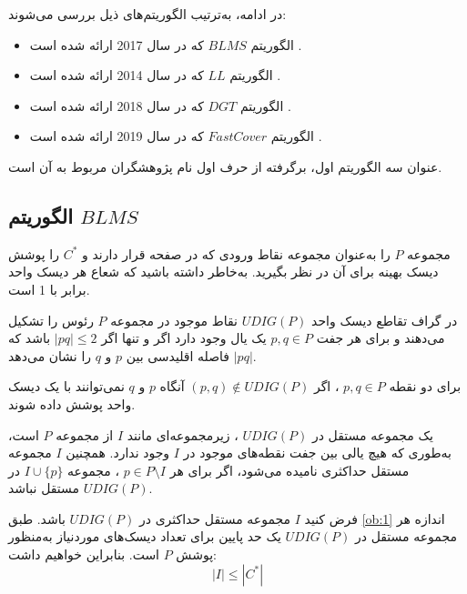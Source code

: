 \documentclass[12pt]{article}
\begin{document}
در ادامه، به‌ترتیب الگوریتم‌های ذیل بررسی می‌شوند: 
\begin{itemize}
\singlespacing
\item
الگوریتم $BLMS$ که در سال 2017 ارائه شده است \cite{biniaz2017approximation}.
\item
الگوریتم $LL$ که در سال 2014 ارائه شده است \cite{liu2014fast}.
\item
الگوریتم $DGT$ که در سال 2018 ارائه شده است \cite{dumitrescu2020online}.
\item
الگوریتم $FastCover$ که در سال 2019 ارائه شده است \cite{ghosh2019unit}.
\end{itemize}
عنوان سه الگوریتم‌ اول، برگرفته از حرف اول نام پژوهشگران مربوط به آن است.


\subsection{
الگوریتم $BLMS$
}

مجموعه $P$ را به‌عنوان مجموعه نقاط ورودی که در صفحه قرار دارند و $C^{*}$ را پوشش دیسک بهینه برای آن در نظر بگیرید. به‌خاطر داشته باشید که شعاع هر دیسک واحد برابر با 1 است.

\begin{definition}
در گراف تقاطع دیسک واحد%
$UDIG(P)$ نقاط موجود در مجموعه $P$ رئوس را تشکیل می‌دهند و برای هر جفت $p,q \in P$ یک یال وجود دارد اگر و تنها اگر $|pq|\leqslant 2$ باشد که $|pq|$ فاصله اقلیدسی بین $p$ و $q$ را نشان می‌دهد.
\label{def:1}
\end{definition}

\begin{observation}
\label{ob:1}
برای دو نقطه $p,q \in P$ ، اگر $(p,q)\notin UDIG(P)$ آنگاه $p$ و $q$ نمی‌توانند با یک دیسک واحد پوشش داده شوند.
\end{observation}

\begin{definition}
یک مجموعه مستقل در $UDIG(P)$ ، زیرمجموعه‌ای مانند $I$ از مجموعه $P$ است، به‌طوری که هیچ یالی بین جفت نقطه‌های موجود در $I$ وجود ندارد. همچنین $I$ مجموعه مستقل حداکثری%
نامیده می‌شود، اگر برای هر $p \in P \setminus I$ ، مجموعه $I \cup \{p\}$ در $UDIG(P)$ مستقل نباشد.
\end{definition}

فرض کنید $I$ مجموعه مستقل حداکثری در $UDIG(P)$ باشد. طبق \cref{ob:1} اندازه هر مجموعه مستقل در $UDIG(P)$ یک حد پایین%
برای تعداد دیسک‌های موردنیاز به‌منظور پوشش $P$ است. بنابراین خواهیم داشت:
\begin{equation}
|I| \leqslant |C^{*}|
\label{eq:1}
\end{equation}
\end{document}
